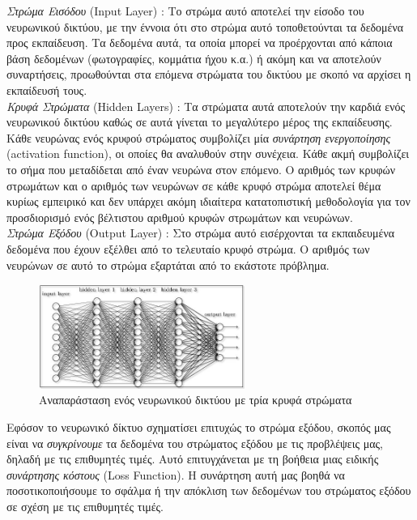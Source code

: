 \documentclass[11pt]{article} %
\numberwithin{equation}{subsection}
\begin{document}
\textit{Στρώμα Εισόδου} (Input Layer) : Το στρώμα αυτό αποτελεί την είσοδο του νευρωνικού δικτύου, με την έννοια ότι στο στρώμα αυτό τοποθετούνται τα δεδομένα προς εκπαίδευση. Τα δεδομένα αυτά, τα οποία μπορεί να προέρχονται από κάποια βάση δεδομένων (φωτογραφίες, κομμάτια ήχου κ.α.) ή ακόμη και να αποτελούν συναρτήσεις, προωθούνται στα επόμενα στρώματα του δικτύου με σκοπό να αρχίσει η εκπαίδευσή τους.\\

\textit{Κρυφά Στρώματα} (Hidden Layers) : Τα στρώματα αυτά αποτελούν την καρδιά ενός νευρωνικού δικτύου καθώς σε αυτά γίνεται το μεγαλύτερο μέρος της εκπαίδευσης. Κάθε νευρώνας ενός κρυφού στρώματος συμβολίζει μία \textit{συνάρτηση ενεργοποίησης} (activation function), οι οποίες θα αναλυθούν στην συνέχεια. Κάθε ακμή συμβολίζει το σήμα που μεταδίδεται από έναν νευρώνα στον επόμενο. Ο αριθμός των κρυφών στρωμάτων και ο αριθμός των νευρώνων σε κάθε κρυφό στρώμα αποτελεί θέμα κυρίως εμπειρικό και δεν υπάρχει ακόμη ιδιαίτερα κατατοπιστική μεθοδολογία για τον προσδιορισμό ενός βέλτιστου αριθμού κρυφών στρωμάτων και νευρώνων.\\

\textit{Στρώμα Εξόδου} (Output Layer) : Στο στρώμα αυτό εισέρχονται τα εκπαιδευμένα δεδομένα που έχουν εξέλθει από το τελευταίο κρυφό στρώμα. Ο αριθμός των νευρώνων σε αυτό το στρώμα εξαρτάται από το εκάστοτε πρόβλημα.\\

\begin{figure}[h]
    \centering
    \includegraphics[width=0.6\textwidth]{NN}
    \caption{Αναπαράσταση ενός νευρωνικού δικτύου με τρία κρυφά στρώματα}
    \label{fig:Neural Net}
\end{figure}


 Εφόσον το νευρωνικό δίκτυο σχηματίσει επιτυχώς το στρώμα εξόδου, σκοπός μας είναι να \textit{συγκρίνουμε} τα δεδομένα του στρώματος εξόδου με τις προβλέψεις μας, δηλαδή με τις επιθυμητές τιμές. Αυτό επιτυγχάνεται με τη βοήθεια μιας ειδικής \textit{συνάρτησης κόστους} (Loss Function). Η συνάρτηση αυτή μας βοηθά να ποσοτικοποιήσουμε το σφάλμα ή την απόκλιση των δεδομένων του στρώματος εξόδου σε σχέση με τις επιθυμητές τιμές.
\end{document}
